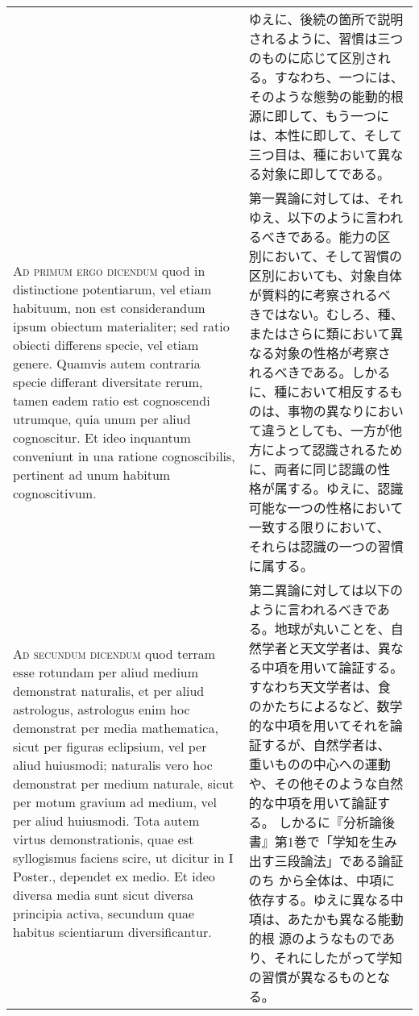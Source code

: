 \documentclass[10pt]{jsarticle} %
\begin{document}
\begin{longtable}{p{21em}p{21em}}
&

ゆえに、後続の箇所で説明されるように、習慣は三つのものに応じて区別され
る。すなわち、一つには、そのような態勢の能動的根源に即して、もう一つに
は、本性に即して、そして三つ目は、種において異なる対象に即してである。

\\



{\scshape Ad primum ergo dicendum} quod in distinctione potentiarum,
vel etiam habituum, non est considerandum ipsum obiectum materialiter;
sed ratio obiecti differens specie, vel etiam genere. Quamvis autem
contraria specie differant diversitate rerum, tamen eadem ratio est
cognoscendi utrumque, quia unum per aliud cognoscitur. Et ideo
inquantum conveniunt in una ratione cognoscibilis, pertinent ad unum
habitum cognoscitivum.

&

第一異論に対しては、それゆえ、以下のように言われるべきである。能力の区
別において、そして習慣の区別においても、対象自体が質料的に考察されるべ
きではない。むしろ、種、またはさらに類において異なる対象の性格が考察さ
れるべきである。しかるに、種において相反するものは、事物の異なりにおい
て違うとしても、一方が他方によって認識されるために、両者に同じ認識の性
格が属する。ゆえに、認識可能な一つの性格において一致する限りにおいて、
それらは認識の一つの習慣に属する。


\\



{\scshape Ad secundum dicendum} quod terram esse rotundam per aliud
medium demonstrat naturalis, et per aliud astrologus, astrologus enim
hoc demonstrat per media mathematica, sicut per figuras eclipsium, vel
per aliud huiusmodi; naturalis vero hoc demonstrat per medium
naturale, sicut per motum gravium ad medium, vel per aliud
huiusmodi. Tota autem virtus demonstrationis, quae est syllogismus
faciens scire, ut dicitur in I Poster., dependet ex medio. Et ideo
diversa media sunt sicut diversa principia activa, secundum quae
habitus scientiarum diversificantur.

&

第二異論に対しては以下のように言われるべきである。地球が丸いことを、自
然学者と天文学者は、異なる中項を用いて論証する。すなわち天文学者は、食
のかたちによるなど、数学的な中項を用いてそれを論証するが、自然学者は、
重いものの中心への運動や、その他そのような自然的な中項を用いて論証する。
しかるに『分析論後書』第1巻で「学知を生み出す三段論法」である論証のち
から全体は、中項に依存する。ゆえに異なる中項は、あたかも異なる能動的根
源のようなものであり、それにしたがって学知の習慣が異なるものとなる。



\end{longtable}
\end{document}
